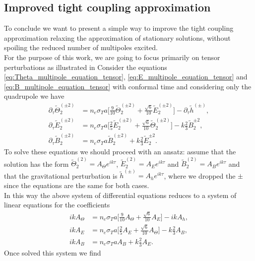\subsection{Improved tight coupling approximation}
To conclude we want to present a simple way to improve the tight coupling approximation relaxing the approximation of stationary solutions, without spoiling the reduced number of multipoles excited.\\ For the purpose of this work, we are going to focus primarily on tensor perturbations as illustrated in %
Consider the equations \eqref{eq:Theta_multipole_equation_tensor}, \eqref{eq:E_multipole_equation_tensor} and \eqref{eq:B_multipole_equation_tensor} with conformal time  and considering only the quadrupole we have
\begin{align*}
    \partial_{\tau}\tilde\Theta_{2}^{(\pm2)}&=n_e\sigma_T a\bigg[\frac{9}{10} \tilde\Theta_{2}^{(\pm2)}+\frac{\sqrt{6}}{10}\tilde E_{2}^{(\pm2)}\bigg]-\partial_{\tau}\tilde h^{(\pm)},\\
    \partial_{\tau}\tilde E_{2}^{(\pm2)}&=n_e\sigma_T a\bigg[\frac{2}{5} \tilde E_{2}^{(\pm2)}+\frac{\sqrt{6}}{10}\tilde \Theta_{2}^{(\pm2)}\bigg]-k\frac{2}{3}\tilde B_2^{\pm2},\\
    \partial_{\tau}\tilde B_{2}^{(\pm2)}&=n_e\sigma_T a\tilde B_{2}^{(\pm2)}+k\frac{2}{3}\tilde E_2^{\pm2}.
\end{align*}
To solve these equations we should proceed with an ansatz: assume that the solution has the form $ \tilde\Theta_{2}^{(2)}=A_\Theta e^{ik\tau}$, $\tilde E_{2}^{(2)}=A_E e^{ik\tau}$ and $\tilde B_{2}^{(2)}=A_B e^{ik\tau}$ and that the gravitational perturbation is $\tilde h^{(\pm)}=A_he^{ik\tau}$, where we dropped the $\pm$ since the equations are the same for both cases.\\ In this way the above system of differential equations reduces to a system of linear equations for the coefficients
\begin{align*}
    ikA_\Theta&=n_e\sigma_T a\bigg[\frac{9}{10} A_\Theta+\frac{\sqrt{6}}{10}A_E\bigg]-ik A_h,\\
    ikA_E&=n_e\sigma_T a\bigg[\frac{2}{5} A_E+\frac{\sqrt{6}}{10}A_\Theta\bigg]-k\frac{2}{3}A_B,\\
    ikA_B&=n_e\sigma_T a A_B+k\frac{2}{3}A_E.
\end{align*}
Once solved this system we find
